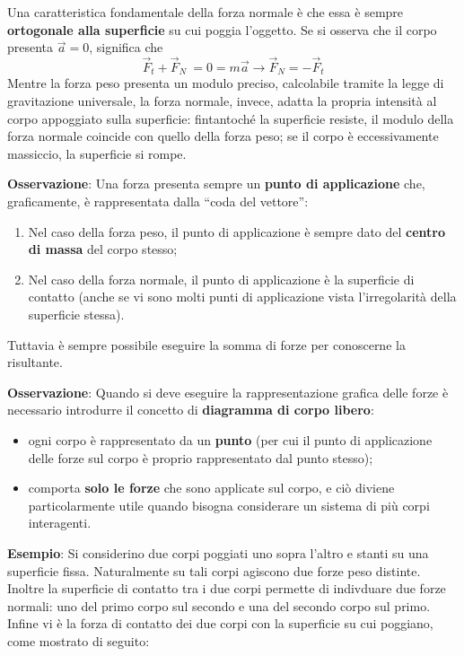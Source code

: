 \documentclass[a4paper]{extarticle}
\newcommand{\quotes}[1]{``#1''}
\begin{document}
\vspace{1em}
\noindent
Una caratteristica fondamentale della forza normale è che essa è sempre \textbf{ortogonale alla superficie} su cui poggia l'oggetto. Se si osserva che il corpo presenta $\vec{a}=0$, significa che
\[\vec{F}_t + \vec{F}_N\ = 0 = m \vec{a} \longrightarrow \vec{F}_N = - \vec{F}_t\]
Mentre la forza peso presenta un modulo preciso, calcolabile tramite la legge di gravitazione universale, la forza normale, invece, adatta la propria intensità al corpo appoggiato sulla superficie: fintantoché la superficie resiste, il modulo della forza normale coincide con quello della forza peso; se il corpo è eccessivamente massiccio, la superficie si rompe.

\vspace{1em}
\noindent
\textbf{Osservazione}: Una forza presenta sempre un \textbf{punto di applicazione} che, graficamente, è rappresentata dalla \quotes{coda del vettore}:
\begin{enumerate}
  \item Nel caso della forza peso, il punto di applicazione è sempre dato del \textbf{centro di massa} del corpo stesso;
  \item Nel caso della forza normale, il punto di applicazione è la superficie di contatto (anche se vi sono molti punti di applicazione vista l'irregolarità della superficie stessa).
\end{enumerate}
Tuttavia è sempre possibile eseguire la somma di forze per conoscerne la risultante.

\vspace{1em}
\noindent
\textbf{Osservazione}: Quando si deve eseguire la rappresentazione grafica delle forze è necessario introdurre il concetto di \textbf{diagramma di corpo libero}:
\begin{itemize}
  \item ogni corpo è rappresentato da un \textbf{punto} (per cui il punto di applicazione delle forze sul corpo è proprio rappresentato dal punto stesso);
  \item comporta \textbf{solo le forze} che sono applicate sul corpo, e ciò diviene particolarmente utile quando bisogna considerare un sistema di più corpi interagenti.
\end{itemize}

\vspace{1em}
\noindent
\textbf{Esempio}: Si considerino due corpi poggiati uno sopra l'altro e stanti su una superficie fissa. Naturalmente su tali corpi agiscono due forze peso distinte. Inoltre la superficie di contatto tra i due corpi permette di indivduare due forze normali: uno del primo corpo sul secondo e una del secondo corpo sul primo. Infine vi è la forza di contatto dei due corpi con la superficie su cui poggiano, come mostrato di seguito:
\end{document}
